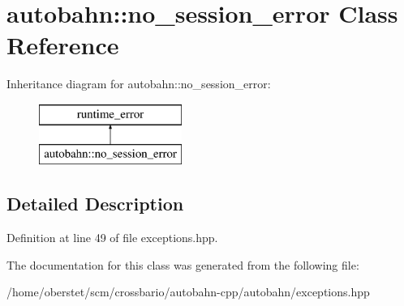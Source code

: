 \hypertarget{classautobahn_1_1no__session__error}{}\section{autobahn\+:\+:no\+\_\+session\+\_\+error Class Reference}
\label{classautobahn_1_1no__session__error}
Inheritance diagram for autobahn\+:\+:no\+\_\+session\+\_\+error\+:\begin{figure}[H]
\begin{center}
\leavevmode
\includegraphics[height=2.000000cm]{classautobahn_1_1no__session__error}
\end{center}
\end{figure}


\subsection{Detailed Description}


Definition at line 49 of file exceptions.\+hpp.



The documentation for this class was generated from the following file\+:\begin{DoxyCompactItemize}
\item 
/home/oberstet/scm/crossbario/autobahn-\/cpp/autobahn/exceptions.\+hpp\end{DoxyCompactItemize}
